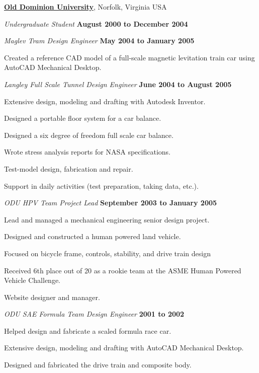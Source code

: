 \documentclass[10pt]{article}
\newenvironment{outerlist}[1][\enskip\textbullet]%
        {\begin{itemize}[#1]}{\end{itemize}%
         \vspace{-.6\baselineskip}}
\newenvironment{innerlist}[1][\enskip\textbullet]%
        {\begin{compactitem}[#1]}{\end{compactitem}}
\begin{document}
\href{http://www.odu.edu}{\textbf{Old Dominion University}}, Norfolk, Virginia USA
\begin{outerlist}
  \item[] \textit{Undergraduate Student}%
    \hfill \textbf{August 2000 to December 2004}

  \item[] \textit{Maglev Tram Design Engineer}%
    \hfill \textbf{May 2004 to January 2005}
  \begin{innerlist}
    \item Created a reference CAD model of a full-scale magnetic levitation
        train car using AutoCAD Mechanical Desktop.
  \end{innerlist}

  \item[] \textit{Langley Full Scale Tunnel Design Engineer}%
    \hfill \textbf{June 2004 to August 2005}
  \begin{innerlist}
    \item Extensive design, modeling and drafting with Autodesk Inventor.
    \item Designed a portable floor system for a car balance.
    \item Designed a six degree of freedom full scale car balance.
    \item Wrote stress analysis reports for NASA specifications.
    \item Test-model design, fabrication and repair.
    \item Support in daily activities (test preparation, taking data, etc.).
  \end{innerlist}

  \item[] \textit{ODU HPV Team Project Lead}%
    \hfill \textbf{September 2003 to January 2005}
  \begin{innerlist}
    \item Lead and managed a mechanical engineering senior design project.
    \item Designed and constructed a human powered land vehicle.
    \item Focused on bicycle frame, controls, stability, and drive train design
    \item Received 6th place out of 20 as a rookie team at the ASME Human
        Powered Vehicle Challenge.
    \item Website designer and manager.
  \end{innerlist}

  \item[] \textit{ODU SAE Formula Team Design Engineer}%
    \hfill \textbf{2001 to 2002}
  \begin{innerlist}
    \item Helped design and fabricate a scaled formula race car.
    \item Extensive design, modeling and drafting with AutoCAD Mechanical Desktop.
    \item Designed and fabricated the drive train and composite body.
  \end{innerlist}
\end{outerlist}
\end{document}

